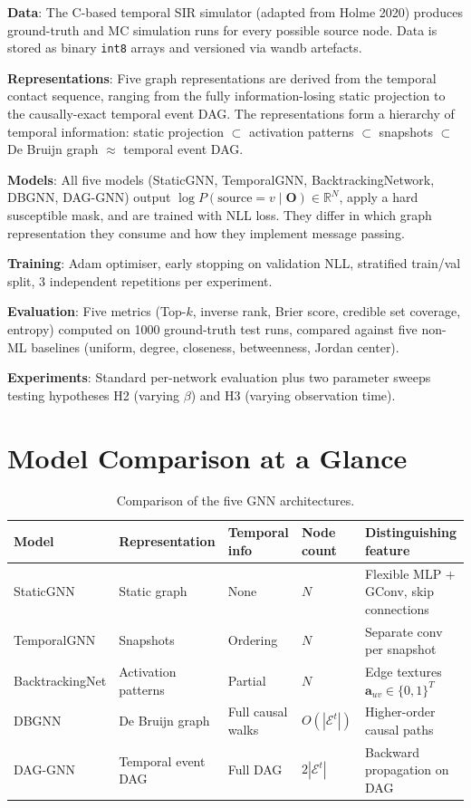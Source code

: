 \documentclass[12pt,a4paper]{report}
\newcommand{\R}{\mathbb{R}}
\newcommand{\calE}{\mathcal{E}}
\begin{document}
\textbf{Data}: The C-based temporal SIR simulator (adapted from Holme 2020)
produces ground-truth and MC simulation runs for every possible source node.
Data is stored as binary \texttt{int8} arrays and versioned via wandb artefacts.

\textbf{Representations}: Five graph representations are derived from the
temporal contact sequence, ranging from the fully information-losing static
projection to the causally-exact temporal event DAG. The representations form
a hierarchy of temporal information: static projection $\subset$ activation
patterns $\subset$ snapshots $\subset$ De Bruijn graph $\approx$ temporal event
DAG.

\textbf{Models}: All five models (StaticGNN, TemporalGNN, BacktrackingNetwork,
DBGNN, DAG-GNN) output $\log P(\text{source} = v \mid \mathbf{O}) \in \R^N$,
apply a hard susceptible mask, and are trained with NLL loss. They differ in
which graph representation they consume and how they implement message passing.

\textbf{Training}: Adam optimiser, early stopping on validation NLL, stratified
train/val split, 3 independent repetitions per experiment.

\textbf{Evaluation}: Five metrics (Top-$k$, inverse rank, Brier score, credible
set coverage, entropy) computed on 1000 ground-truth test runs, compared against
five non-ML baselines (uniform, degree, closeness, betweenness, Jordan center).

\textbf{Experiments}: Standard per-network evaluation plus two parameter sweeps
testing hypotheses H2 (varying $\beta$) and H3 (varying observation time).

\section{Model Comparison at a Glance}

\begin{table}[H]
\centering
\caption{Comparison of the five GNN architectures.}
\label{tab:model_comparison}
\begin{tabular}{llllp{4cm}}
\toprule
Model & Representation & Temporal info & Node count & Distinguishing feature \\
\midrule
StaticGNN & Static graph & None & $N$ & Flexible MLP + GConv, skip connections \\
TemporalGNN & Snapshots & Ordering & $N$ & Separate conv per snapshot \\
BacktrackingNet & Activation patterns & Partial & $N$ & Edge textures $\mathbf{a}_{uv} \in \{0,1\}^T$ \\
DBGNN & De Bruijn graph & Full causal walks & $O(|\calE^t|)$ & Higher-order causal paths \\
DAG-GNN & Temporal event DAG & Full DAG & $2|\calE^t|$ & Backward propagation on DAG \\
\bottomrule
\end{tabular}
\end{table}
\end{document}
